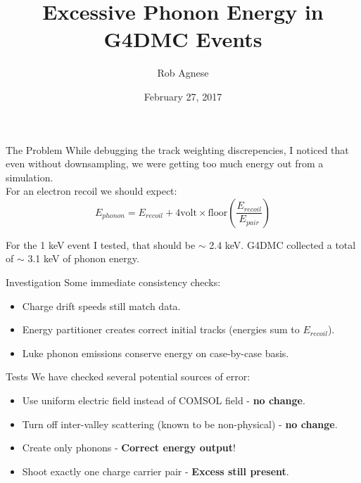 \documentclass{beamer}
\title[G4DMC]{Excessive Phonon Energy in G4DMC Events}
\author{Rob Agnese}
\institute{University of Florida}
\date{February 27, 2017}
\begin{document}
\begin{frame}
    \titlepage{}
\end{frame}

\begin{frame}{The Problem}
    \vfill
    While debugging the track weighting discrepencies, I noticed that
    even without downsampling, we were getting too much energy out from a 
    simulation. \\

    For an electron recoil we should expect:
    \begin{equation}
        E_{phonon} = E_{recoil} + 4 \textrm{volt} \times 
        \textrm{floor}\left(\frac{E_{recoil}}{E_{pair}}\right)
    \end{equation}

    For the 1 keV event I tested, that should be $\sim$ 2.4 keV. G4DMC collected
    a total of $\sim$ 3.1 keV of phonon energy.
    \vfill
\end{frame}

\begin{frame}{Investigation}
    \vfill
    Some immediate consistency checks:
    \begin{itemize}
        \item Charge drift speeds still match data.
        \item Energy partitioner creates correct initial tracks (energies sum to $E_{recoil}$).
        \item Luke phonon emissions conserve energy on case-by-case basis.
    \end{itemize}
    \vfill
\end{frame}

\begin{frame}{Tests}
    \vfill
    We have checked several potential sources of error:
    \begin{itemize}
        \item Use uniform electric field instead of COMSOL field - \textbf{no change}.
        \item Turn off inter-valley scattering (known to be non-physical) - \textbf{no change}.
        \item Create only phonons - \textbf{Correct energy output}!
        \item Shoot exactly one charge carrier pair - \textbf{Excess still present}.
    \end{itemize}
    \vfill
\end{frame}
\end{document}
